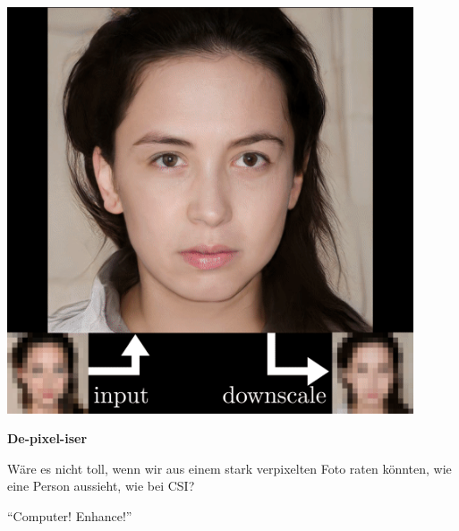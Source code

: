 \documentclass[aspectratio=169,usenames,dvipsnames]{beamer}
\begin{document}
\begin{frame}
\begin{minipage}{.5\textwidth}
\includegraphics[width=0.9\textwidth, keepaspectratio]{images/step7}
\end{minipage}\begin{minipage}{.5\textwidth}
\textbf{De-pixel-iser}
\bigskip

Wäre es nicht toll, wenn wir aus einem stark verpixelten Foto raten könnten, wie eine Person aussieht, wie bei CSI?
\bigskip

``Computer! Enhance!''
\end{minipage}
\end{frame}
\end{document}
